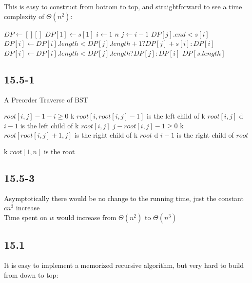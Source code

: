 \documentclass[]{article}
\begin{document}
This is easy to construct from bottom to top, and straightforward to see a time complexity of $\Theta (n^2)$:

\begin{codebox}
	\li $DP \leftarrow [][]$
	\li $DP[1] \leftarrow s[1]$
	\li \For $i \leftarrow 1 $ \To $n$ 
	\li \Do \For $j \leftarrow i-1 $ 
	\li \Do \If $DP[j].end < s[i]$
	\li \Then $DP[i] \leftarrow DP[i].length < DP[j].length + 1 ? DP[j] + s[i] : DP[i]$
	\li \Else $DP[i] \leftarrow DP[i].length < DP[j].length ? DP[j] : DP[i]$
    \End \End \End
	\li \Return $DP[s.length]$

\end{codebox}

\subsection{15.5-1}
A Preorder Traverse of BST

\begin{codebox}
	\li \If $root[i,j]-1-i \ge 0$ \Then
	\li k $root[i,root[i,j]-1]$ is the left child of k $root[i,j]$
	\li {}
	\li \Else d $i-1$ is the left child of k $root[i,j]$
	\End
	\li \If $j-root[i,j]-1\ge 0$ \Then
	\li k $root[root[i,j]+1, j]$ is the right child of k $root$
	\li {}
	\li \Else d $i-1$ is the right child of $root$
	\End
\end{codebox}

\begin{codebox}
	\li k $root[1,n]$ is the root
	\li {}
\end{codebox}

\subsection{15.5-3}
Asymptotically there would be no change to the running time, just the constant $cn^3$ increase\\
Time spent on $w$ would increase from $\Theta(n^2)$ to $\Theta(n^3)$

\subsection{15.1}

It is easy to implement a memorized recursive algorithm, but very hard to build from down to top:
\end{document}
